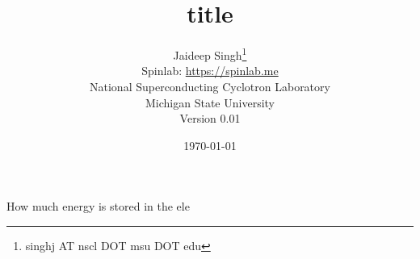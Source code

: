 \documentclass[letterpaper,12pt]{article}
\title{title}
\author{Jaideep Singh\footnote{singhj AT nscl DOT msu DOT edu}\\ Spinlab: \href{https://spinlab.me}{https://spinlab.me} \\ National Superconducting Cyclotron Laboratory\\ Michigan State University\\Version 0.01}
\date{\today}
\begin{document}
\maketitle
How much energy is stored in the ele

%
%
\end{document}
